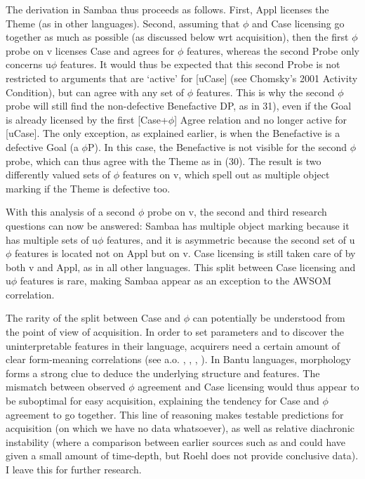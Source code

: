 \documentclass[output=paper
,modfonts
,nonflat]{langsci/langscibook}
\begin{document}
The derivation in Sambaa thus proceeds as follows. First, Appl licenses the Theme (as in other languages). Second, assuming that $\phi$ and Case licensing go together as much as possible (as discussed below wrt acquisition), then the first $\phi$ probe on v licenses Case and agrees for $\phi$ features, whereas the second Probe only concerns u$\phi$ features. It would thus be expected that this second Probe is not restricted to arguments that are ‘active’ for [uCase] (see Chomsky’s 2001 Activity Condition), but can agree with any set of $\phi$ features. This is why the second $\phi$ probe will still find the non-defective Benefactive DP, as in 31), even if the Goal is already licensed by the first [Case+$\phi$] Agree relation and no longer active for [uCase]. The only exception, as explained earlier, is when the Benefactive is a defective Goal (a $\phi$P). In this case, the Benefactive is not visible for the second $\phi$ probe, which can thus agree with the Theme as in (30). The result is two differently valued sets of $\phi$ features on v, which spell out as multiple object marking if the Theme is defective too.

With this analysis of a second $\phi$ probe on v, the second and third research questions can now be answered: Sambaa has multiple object marking because it has multiple sets of u$\phi$ features, and it is asymmetric because the second set of u$\phi$ features is located not on Appl but on v. Case licensing is still taken care of by both v and Appl, as in all other languages. This split between Case licensing and u$\phi$ features is rare, making Sambaa appear as an exception to the AWSOM correlation.

The rarity of the split between Case and $\phi$ can potentially be understood from the point of view of acquisition. In order to set parameters and to discover the uninterpretable features in their language, acquirers need a certain amount of clear form-meaning correlations (see a.o. \citealt{Biberauer2017a}, \citealt{Biberauer2017b}, \citealt{Biberauer_Roberts2017},  \citealt{Fasanella_Fortuny2016}). In Bantu languages, morphology forms a strong clue to deduce the underlying structure and features. The mismatch between observed $\phi$ agreement and Case licensing would thus appear to be suboptimal for easy acquisition, explaining the tendency for Case and $\phi$ agreement to go together. This line of reasoning makes testable predictions for acquisition (on which we have no data whatsoever), as well as relative diachronic instability (where a comparison between earlier sources such as \citealt{Roehl1911} and \citealt{Riedel2009} could have given a small amount of time-depth, but Roehl does not provide conclusive data). I leave this for further research.
\end{document}
